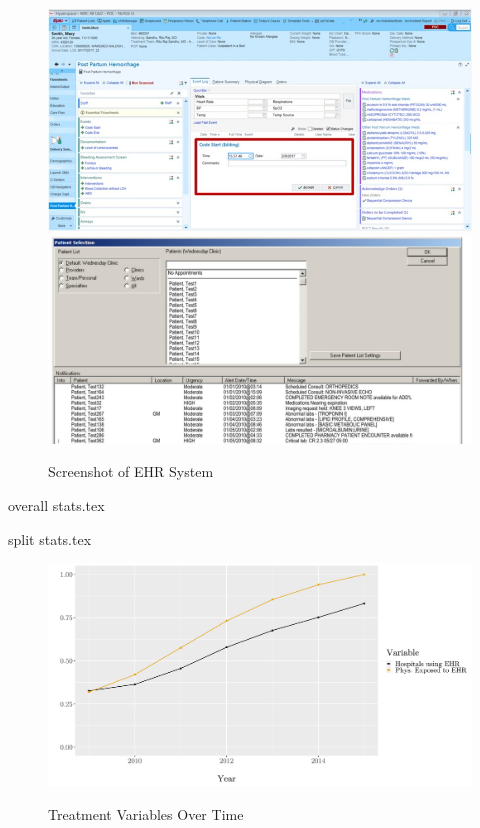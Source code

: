 \documentclass[11pt]{article}
\begin{document}
\begin{figure}[htp]
    \centering
    \caption{Screenshot of EHR System}
    \includegraphics[scale=.5]{Objects/epic-ehr-screenshot.jpg}
    \includegraphics[scale=.135]{Objects/EHRimage2.jpg}
    \label{fig:EPIC}
\end{figure}

{overall stats.tex}

{split stats.tex}

\begin{figure}[p]
\centering
    \caption{Treatment Variables Over Time}
    \includegraphics[scale=.55]{Objects/sum_stats_year.pdf}
    \label{fig:treatmentgraph}
\end{figure}
\end{document}
